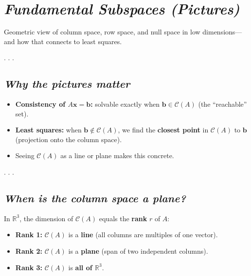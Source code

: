 \documentclass[
  letterpaper,
  DIV=11,
  numbers=noendperiod]{scrartcl}
\providecommand{\tightlist}{%
  \setlength{\itemsep}{0pt}\setlength{\parskip}{0pt}}\usepackage{longtable,booktabs,array}
\begin{document}
\section{\texorpdfstring{\emph{Fundamental Subspaces
(Pictures)}}{Fundamental Subspaces (Pictures)}}\label{fundamental-subspaces-pictures}

Geometric view of column space, row space, and null space in low
dimensions---and how that connects to least squares.

. . .

\subsection{\texorpdfstring{\emph{Why the pictures
matter}}{Why the pictures matter}}\label{why-the-pictures-matter}

\begin{itemize}
\tightlist
\item
  \textbf{Consistency of \(A\mathbf{x}=\mathbf{b}\):} solvable exactly
  when \(\mathbf{b} \in \mathcal{C}(A)\) (the ``reachable'' set).
\item
  \textbf{Least squares:} when \(\mathbf{b} \notin \mathcal{C}(A)\), we
  find the \textbf{closest point} in \(\mathcal{C}(A)\) to
  \(\mathbf{b}\) (projection onto the column space).
\item
  Seeing \(\mathcal{C}(A)\) as a line or plane makes this concrete.
\end{itemize}

. . .

\subsection{\texorpdfstring{\emph{When is the column space a
plane?}}{When is the column space a plane?}}\label{when-is-the-column-space-a-plane}

In \(\mathbb{R}^3\), the dimension of \(\mathcal{C}(A)\) equals the
\textbf{rank} \(r\) of \(A\):

\begin{itemize}
\tightlist
\item
  \textbf{Rank 1:} \(\mathcal{C}(A)\) is a \textbf{line} (all columns
  are multiples of one vector).
\item
  \textbf{Rank 2:} \(\mathcal{C}(A)\) is a \textbf{plane} (span of two
  independent columns).
\item
  \textbf{Rank 3:} \(\mathcal{C}(A)\) is \textbf{all of
  \(\mathbb{R}^3\)}.
\end{itemize}
\end{document}
